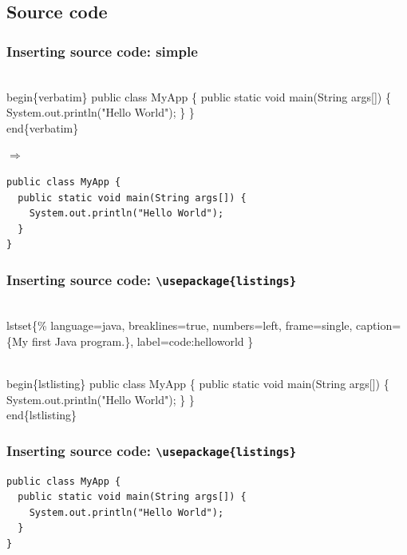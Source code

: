\documentclass{beamer}
\begin{document}
\subsection{Source code}

\begin{frame}[fragile]
  \frametitle{Inserting source code: simple}

\begin{semiverbatim}
\alert{\\begin\{verbatim\}}
public class MyApp \{
  public static void main(String args[]) \{
    System.out.println("Hello World");
  \}
\}
\alert{\\end\{verbatim\}}
\end{semiverbatim}
$\Rightarrow$
\begin{verbatim}
public class MyApp {
  public static void main(String args[]) {
    System.out.println("Hello World");
  }
}
\end{verbatim}  

\end{frame}

\begin{frame}[fragile]
  \frametitle{Inserting source code: \texttt{\textbackslash{}usepackage\{listings\}}}

\begin{semiverbatim}
\\lstset\{\%
  language=java,    breaklines=true,
  numbers=left,     frame=single,
  caption=\{My first Java program.\},
  label=code:helloworld
\}

\alert{\\begin\{lstlisting\}}
public class MyApp \{
  public static void main(String args[]) \{
    System.out.println("Hello World");
  \}
\}
\alert{\\end\{lstlisting\}}
\end{semiverbatim}

\end{frame}

\begin{frame}[fragile]
  \frametitle{Inserting source code: \texttt{\textbackslash{}usepackage\{listings\}}}


\begin{lstlisting}
public class MyApp {
  public static void main(String args[]) {
    System.out.println("Hello World");
  }
}
\end{lstlisting}

\end{frame}
\end{document}
